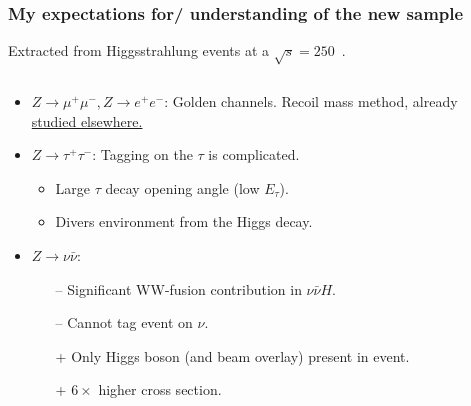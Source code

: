 
\begin{frame}
  \frametitle{My expectations for/ understanding of the new sample}
  Extracted from Higgsstrahlung events at a $\sqrt{s}=250$~\GeV.
  \begin{columns}[c,onlytextwidth]
  \begin{column}{0.60\textwidth}
  \begin{itemize}
    \item $Z \rightarrow \mu^+ \mu^-, Z \rightarrow e^+ e^-$:
          Golden channels.\newline
          Recoil mass method, already {\color{llblue}
            \href{https://arxiv.org/abs/1604.07524}{studied elsewhere.}}
    \item $Z \rightarrow \tau^+ \tau^-$:
        Tagging on the $\tau$ is complicated.
        \begin{itemize}
          \item Large $\tau$ decay opening angle (low $E_\tau$).
          \item Divers environment from the Higgs decay.
        \end{itemize}
    \item $Z \rightarrow \nu\bar{\nu}$:
      \begin{itemize}
        \item[--] Significant WW-fusion contribution in $\nu\bar{\nu}H$.
        \item[--] Cannot tag event on $\nu$.
        \item[+]  Only Higgs boson (and beam overlay) present in event.
        \item[+]  $6\times$ higher cross section.
      \end{itemize}
  \end{itemize}
  \end{column}
  \begin{column}{0.40\textwidth}
    \resizebox{\textwidth}{!}{
      
    }
  \end{column}
  \end{columns}
  \end{frame}


